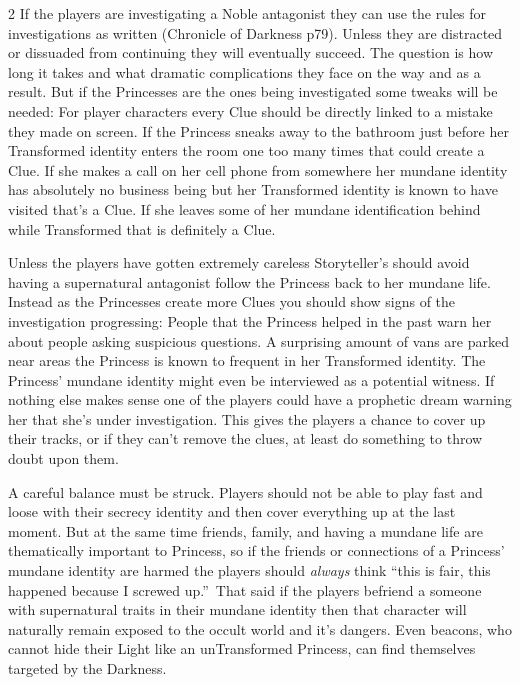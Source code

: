 \begin{multicols}{2}
If the players are investigating a Noble antagonist they can use the rules for investigations as written (Chronicle of Darkness p79). Unless they are distracted or dissuaded from continuing they will eventually succeed. The question is how long it takes and what dramatic complications they face on the way and as a result. But if the Princesses are the ones being investigated some tweaks will be needed: For player characters every Clue should be directly linked to a mistake they made on screen. If the Princess sneaks away to the bathroom just before her Transformed identity enters the room one too many times that could create a Clue. If she makes a call on her cell phone from somewhere her mundane identity has absolutely no business being but her Transformed identity is known to have visited that's a Clue. If she leaves some of her mundane identification behind while Transformed that is definitely a Clue.

Unless the players have gotten extremely careless Storyteller's should avoid having a supernatural antagonist follow the Princess back to her mundane life. Instead as the Princesses create more Clues you should show signs of the investigation progressing: People that the Princess helped in the past warn her about people asking suspicious questions. A surprising amount of vans are parked near areas the Princess is known to frequent in her Transformed identity. The Princess' mundane identity might even be interviewed as a potential witness. If nothing else makes sense one of the players could have a prophetic dream warning her that she's under investigation. This gives the players a chance to cover up their tracks, or if they can't remove the clues, at least do something to throw doubt upon them. 

A careful balance must be struck. Players should not be able to play fast and loose with their secrecy identity and then cover everything up at the last moment. But at the same time friends, family, and having a mundane life are thematically important to Princess, so if the friends or connections of a Princess' mundane identity are harmed the players should \textit{always} think \textquotedblleft this is fair, this happened because I screwed up.\textquotedblright\, That said if the players befriend a someone with supernatural traits in their mundane identity then that character will naturally remain exposed to the occult world and it's dangers. Even beacons, who cannot hide their Light like an unTransformed Princess, can find themselves targeted by the Darkness. 


\end{multicols}
